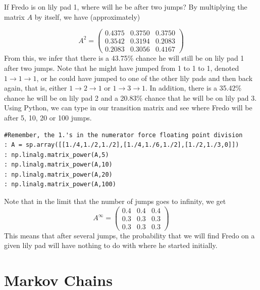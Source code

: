 If Fredo is on lily pad 1, where will he be after two jumps?
By multiplying the matrix $A$ by itself, we have (approximately)

\[
A^2 = \begin{pmatrix}
0.4375 & 0.3750 & 0.3750\\
0.3542 & 0.3194 & 0.2083\\
0.2083 & 0.3056 & 0.4167
\end{pmatrix}
\]
From this, we infer that there is a 43.75\% chance he will still be on lily pad 1 after two jumps.
Note that he might have jumped from 1 to 1 to 1, denoted $1 \rightarrow 1 \rightarrow 1$, or he could have jumped to one of the other lily pads and then back again, that is, either $1 \rightarrow 2 \rightarrow 1$ or $1 \rightarrow 3 \rightarrow 1$.
In addition, there is a 35.42\% chance he will be on lily pad 2 and a 20.83\% chance that he will be on lily pad 3.
Using Python, we can type in our transition matrix and see where Fredo will be after 5, 10, 20 or 100 jumps.

\begin{lstlisting}[style=python]
#Remember, the 1.'s in the numerator force floating point division
: A = sp.array([[1./4,1./2,1./2],[1./4,1./6,1./2],[1./2,1./3,0]])
: np.linalg.matrix_power(A,5)
: np.linalg.matrix_power(A,10)
: np.linalg.matrix_power(A,20)
: np.linalg.matrix_power(A,100)
\end{lstlisting}

Note that in the limit that the number of jumps goes to infinity, we get
\[
A^\infty = \begin{pmatrix}
0.4 & 0.4 & 0.4\\
0.3 & 0.3 & 0.3\\
0.3 & 0.3 & 0.3
\end{pmatrix}
\]
This means that after several jumps, the probability that we will find Fredo on a given lily pad will have nothing to do with where he started initially.
 
\section*{Markov Chains}

